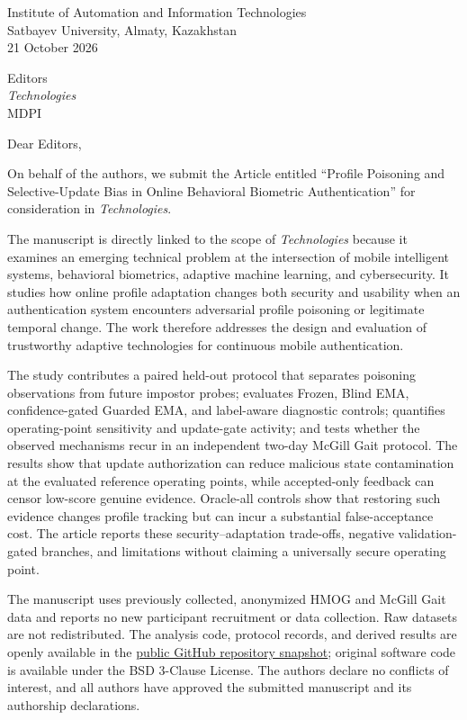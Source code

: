 \documentclass[11pt]{article}
\begin{document}
\begin{flushright}
Institute of Automation and Information Technologies\\
Satbayev University, Almaty, Kazakhstan\\
21 October 2026
\end{flushright}

Editors\\
\emph{Technologies}\\
MDPI

\vspace{0.6em}
Dear Editors,

On behalf of the authors, we submit the Article entitled ``Profile Poisoning and Selective-Update Bias in Online Behavioral Biometric Authentication'' for consideration in \emph{Technologies}.

The manuscript is directly linked to the scope of \emph{Technologies} because it examines an emerging technical problem at the intersection of mobile intelligent systems, behavioral biometrics, adaptive machine learning, and cybersecurity. It studies how online profile adaptation changes both security and usability when an authentication system encounters adversarial profile poisoning or legitimate temporal change. The work therefore addresses the design and evaluation of trustworthy adaptive technologies for continuous mobile authentication.

The study contributes a paired held-out protocol that separates poisoning observations from future impostor probes; evaluates Frozen, Blind EMA, confidence-gated Guarded EMA, and label-aware diagnostic controls; quantifies operating-point sensitivity and update-gate activity; and tests whether the observed mechanisms recur in an independent two-day McGill Gait protocol. The results show that update authorization can reduce malicious state contamination at the evaluated reference operating points, while accepted-only feedback can censor low-score genuine evidence. Oracle-all controls show that restoring such evidence changes profile tracking but can incur a substantial false-acceptance cost. The article reports these security--adaptation trade-offs, negative validation-gated branches, and limitations without claiming a universally secure operating point.

The manuscript uses previously collected, anonymized HMOG and McGill Gait data and reports no new participant recruitment or data collection. Raw datasets are not redistributed. The analysis code, protocol records, and derived results are openly available in the \href{https://github.com/madigali/profile-poisoning-online-authentication/tree/technologies-submission-v1.0.1}{public GitHub repository snapshot}; original software code is available under the BSD 3-Clause License. The authors declare no conflicts of interest, and all authors have approved the submitted manuscript and its authorship declarations.
\end{document}
